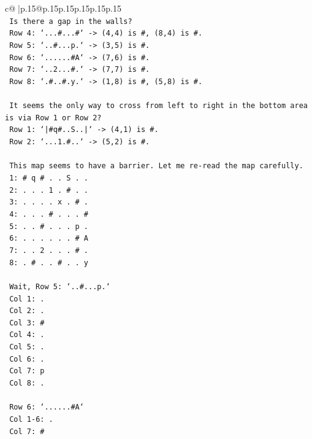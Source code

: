 \documentclass{article}
\begin{document}
{\begin{supertabular}{c@{$\;$}|p{.15\linewidth}@{}p{.15\linewidth}p{.15\linewidth}p{.15\linewidth}p{.15\linewidth}p{.15\linewidth}}
{{{\\ 
\texttt{  Is there a gap in the walls?} \\
\texttt{  Row 4: `...\#...\#` {-}> (4,4) is \#, (8,4) is \#.} \\
\texttt{  Row 5: `..\#...p.` {-}> (3,5) is \#.} \\
\texttt{  Row 6: `......\#A` {-}> (7,6) is \#.} \\
\texttt{  Row 7: `..2...\#.` {-}> (7,7) is \#.} \\
\texttt{  Row 8: `.\#..\#.y.` {-}> (1,8) is \#, (5,8) is \#.} \\
\\ 
\texttt{  It seems the only way to cross from left to right in the bottom area is via Row 1 or Row 2?} \\
\texttt{  Row 1: `|\#q\#..S..|` {-}> (4,1) is \#.} \\
\texttt{  Row 2: `...1.\#..` {-}> (5,2) is \#.} \\
\\ 
\texttt{  This map seems to have a barrier. Let me re{-}read the map carefully.} \\
\texttt{  1: \# q \# . . S . .} \\
\texttt{  2: . . . 1 . \# . .} \\
\texttt{  3: . . . . x . \# .} \\
\texttt{  4: . . . \# . . . \#} \\
\texttt{  5: . . \# . . . p .} \\
\texttt{  6: . . . . . . \# A} \\
\texttt{  7: . . 2 . . . \# .} \\
\texttt{  8: . \# . . \# . . y} \\
\\ 
\texttt{  Wait, Row 5: `..\#...p.`} \\
\texttt{  Col 1: .} \\
\texttt{  Col 2: .} \\
\texttt{  Col 3: \#} \\
\texttt{  Col 4: .} \\
\texttt{  Col 5: .} \\
\texttt{  Col 6: .} \\
\texttt{  Col 7: p} \\
\texttt{  Col 8: .} \\
\\ 
\texttt{  Row 6: `......\#A`} \\
\texttt{  Col 1{-}6: .} \\
\texttt{  Col 7: \#} \\
}}}
\end{supertabular}}
\end{document}
